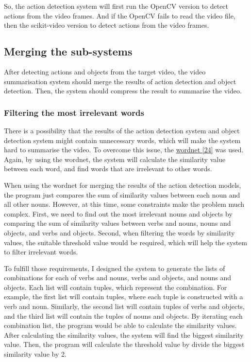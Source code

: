 \documentclass{article}
\begin{document}
So, the action detection system will first run the OpenCV version to detect actions from the video frames. And if the OpenCV fails to read the video file, then the scikit-video version to detect actions from the video frames.

\subsection{Merging the sub-systems}

After detecting actions and objects from the target video, the video summarisation system should merge the results of action detection and object detection. Then, the system should compress the result to summarise the video.

\subsubsection{Filtering the most irrelevant words}

There is a possibility that the results of the action detection system and object detection system might contain unnecessary words, which will make the system hard to summarise the video. To overcome this issue, the \hyperlink{ref24}{wordnet [24]} was used. Again, by using the wordnet, the system will calculate the similarity value between each word, and find words that are irrelevant to other words.

When using the wordnet for merging the results of the action detection models, the program just compares the sum of similarity values between each noun and all other nouns. However, at this time, some constraints make the problem much complex. First, we need to find out the most irrelevant nouns and objects by comparing the sum of similarity values between verbs and nouns, nouns and objects, and verbs and objects. Second, when filtering the words by similarity values, the suitable threshold value would be required, which will help the system to filter irrelevant words.

To fulfill those requirements, I designed the system to generate the lists of combinations for each of verbs and nouns, verbs and objects, and nouns and objects. Each list will contain tuples, which represent the combination. For example, the first list will contain tuples, where each tuple is constructed with a verb and noun. Similarly, the second list will contain tuples of verbs and objects, and the third list will contain the tuples of nouns and objects. By iterating each combination list, the program would be able to calculate the similarity values. After calculating the similarity values, the system will find the biggest similarity value. Then, the program will calculate the threshold value by divide the biggest similarity value by 2.
\end{document}
